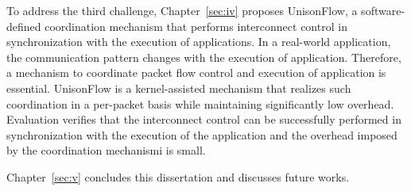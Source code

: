 To address the third challenge, Chapter~\ref{sec:iv} proposes UnisonFlow, a
software-defined coordination mechanism that performs interconnect control in
synchronization with the execution of applications. In a real-world
application, the communication pattern changes with the execution of
application. Therefore, a mechanism to coordinate packet flow control and
execution of application is essential. UnisonFlow is a kernel-assisted
mechanism that realizes such coordination in a per-packet basis while
maintaining significantly low overhead. Evaluation verifies that the
interconnect control can be successfully performed in synchronization with the
execution of the application and the overhead imposed by the coordination
mechanismi is small.

Chapter~\ref{sec:v} concludes this dissertation and discusses future works.

\pagestyle{headings}
